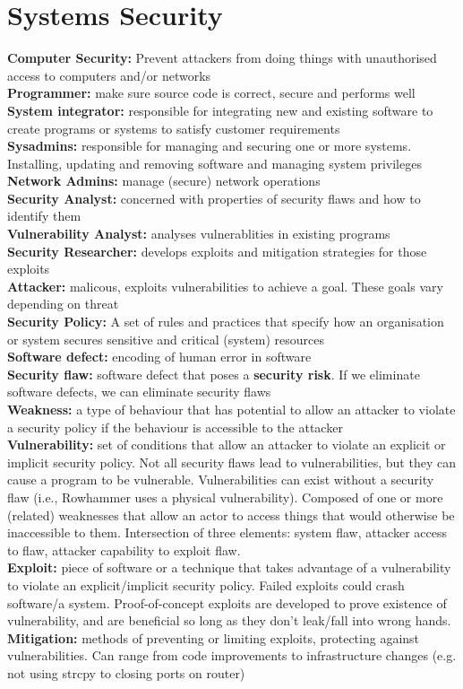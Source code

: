 \documentclass{article}
\begin{document}
\section{Systems Security}
\textbf{Computer Security:} Prevent attackers from doing things with unauthorised access to computers and/or networks
\\\textbf{Programmer:} make sure source code is correct, secure and performs well
\\\textbf{System integrator:} responsible for integrating new and existing software to create programs or systems to satisfy customer requirements
\\\textbf{Sysadmins:} responsible for managing and securing one or more systems. Installing, updating and removing software and managing system privileges
\\\textbf{Network Admins:} manage (secure) network operations
\\\textbf{Security Analyst:} concerned with properties of security flaws and how to identify them
\\\textbf{Vulnerability Analyst:} analyses vulnerablities in existing programs
\\\textbf{Security Researcher:} develops exploits and mitigation strategies for those exploits
\\\textbf{Attacker:} malicous, exploits vulnerabilities to achieve a goal. These goals vary depending on threat
\\\textbf{Security Policy:} A set of rules and practices that specify how an organisation or system secures sensitive and critical (system) resources
\\\textbf{Software defect:} encoding of human error in software
\\\textbf{Security flaw:} software defect that poses a \textbf{security risk}. If we eliminate software defects, we can eliminate security flaws
\\\textbf{Weakness:} a type of behaviour that has potential to allow an attacker to violate a security policy if the behaviour is accessible to the attacker
\\\textbf{Vulnerability:} set of conditions that allow an attacker to violate an explicit or implicit security policy. Not all security flaws lead to vulnerabilities, but they can cause a program to be vulnerable. Vulnerabilities can exist without a security flaw (i.e., Rowhammer uses a physical vulnerability). Composed of one or more (related) weaknesses that allow an actor to access things that would otherwise be inaccessible to them. Intersection of three elements: system flaw, attacker access to flaw, attacker capability to exploit flaw.
\\\textbf{Exploit:} piece of software or a technique that takes advantage of a vulnerability to violate an explicit/implicit security policy. Failed exploits could crash software/a system. Proof-of-concept exploits are developed to prove existence of vulnerability, and are beneficial so long as they don't leak/fall into wrong hands.
\\\textbf{Mitigation:} methods of preventing or limiting exploits, protecting against vulnerabilities. Can range from code improvements to infrastructure changes (e.g. not using strcpy to closing ports on router)
\end{document}
